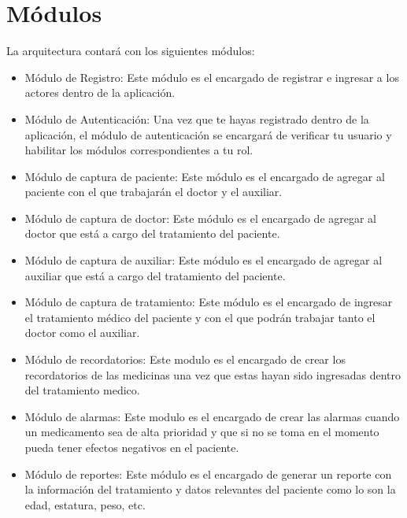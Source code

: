\section{Módulos}
La arquitectura contará con los siguientes módulos:
\begin{itemize}
	\item Módulo de Registro: Este módulo es el encargado de registrar e ingresar a los actores dentro de la aplicación. 
	
	
	\item Módulo de Autenticación: Una vez que te hayas registrado dentro de la aplicación, el módulo de autenticación se encargará de verificar tu usuario y habilitar los módulos correspondientes a tu rol.
	
	 
	\item Módulo de captura de paciente: Este módulo es el encargado de agregar al paciente con el que trabajarán el doctor y el auxiliar.
	
	\item Módulo de captura de doctor: Este módulo es el encargado de agregar al doctor que está a cargo del tratamiento del paciente.
	
	\item Módulo de captura de auxiliar: Este módulo es el encargado de agregar al auxiliar que está a cargo del tratamiento del paciente.
	
	\item Módulo de captura de tratamiento: Este módulo es el encargado de ingresar el tratamiento médico del paciente y con el que podrán trabajar tanto el doctor como el auxiliar. 
	
	\item Módulo de recordatorios: Este modulo es el encargado de crear los recordatorios de las medicinas una vez que estas hayan sido ingresadas dentro del tratamiento medico.
	
	\item Módulo de alarmas: Este modulo es el encargado de crear las alarmas cuando un medicamento sea de alta prioridad y que si no se toma en el momento pueda tener efectos negativos en el paciente.
	
	\item Módulo de reportes: Este módulo es el encargado de generar un reporte con la información del tratamiento y datos relevantes del paciente como lo son la edad, estatura, peso, etc.
	
	
	

\end{itemize}
